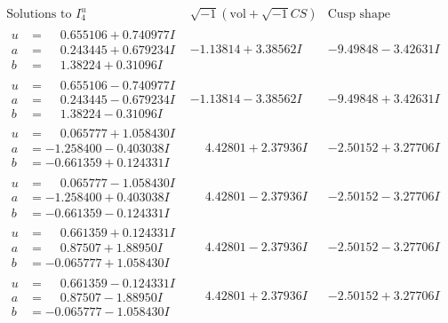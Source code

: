 \documentclass[1p]{elsarticle_modified}
\theoremstyle{definition}
\newcommand{\I}{\sqrt{-1}}
\begin{document}
$$\begin{array}{c|c|c}  
\text{Solutions to }I^u_{4}& \I (\text{vol} + \sqrt{-1}CS) & \text{Cusp shape}\\
 \hline 
\begin{aligned}
u &= \phantom{-}0.655106 + 0.740977 I \\
a &= \phantom{-}0.243445 + 0.679234 I \\
b &= \phantom{-}1.38224 + 0.31096 I\end{aligned}
 & -1.13814 + 3.38562 I & -9.49848 - 3.42631 I \\ \hline\begin{aligned}
u &= \phantom{-}0.655106 - 0.740977 I \\
a &= \phantom{-}0.243445 - 0.679234 I \\
b &= \phantom{-}1.38224 - 0.31096 I\end{aligned}
 & -1.13814 - 3.38562 I & -9.49848 + 3.42631 I \\ \hline\begin{aligned}
u &= \phantom{-}0.065777 + 1.058430 I \\
a &= -1.258400 - 0.403038 I \\
b &= -0.661359 + 0.124331 I\end{aligned}
 & \phantom{-}4.42801 + 2.37936 I & -2.50152 + 3.27706 I \\ \hline\begin{aligned}
u &= \phantom{-}0.065777 - 1.058430 I \\
a &= -1.258400 + 0.403038 I \\
b &= -0.661359 - 0.124331 I\end{aligned}
 & \phantom{-}4.42801 - 2.37936 I & -2.50152 - 3.27706 I \\ \hline\begin{aligned}
u &= \phantom{-}0.661359 + 0.124331 I \\
a &= \phantom{-}0.87507 + 1.88950 I \\
b &= -0.065777 + 1.058430 I\end{aligned}
 & \phantom{-}4.42801 - 2.37936 I & -2.50152 - 3.27706 I \\ \hline\begin{aligned}
u &= \phantom{-}0.661359 - 0.124331 I \\
a &= \phantom{-}0.87507 - 1.88950 I \\
b &= -0.065777 - 1.058430 I\end{aligned}
 & \phantom{-}4.42801 + 2.37936 I & -2.50152 + 3.27706 I \\ \hline\begin{aligned}

\end{aligned}
\end{array}$$
\end{document}

